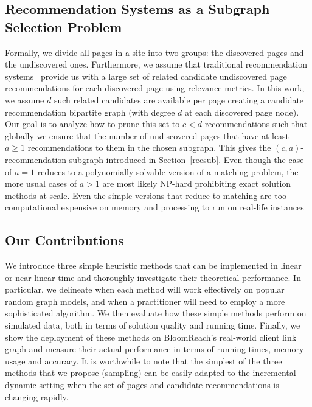 \subsection{Recommendation Systems as a Subgraph Selection Problem}

Formally, we divide all pages in a site into two groups: the discovered pages and the undiscovered ones.
Furthermore, we assume that traditional recommendation systems~\cite{Schafer1999, Adomavicius2005,
  Resnick1997} provide us with a large set of related candidate undiscovered page recommendations
for each discovered page using relevance metrics. In this work, we assume $d$
such related candidates are available per page creating a candidate recommendation bipartite graph
(with degree $d$ at each discovered page node).
Our goal is to analyze how to prune this set to $c < d$ recommendations such that
globally we ensure that the number of undiscovered pages that have at least $a \geq 1$ recommendations to them in the chosen subgraph. This gives the $(c,a)$-recommendation subgraph introduced in Section~\ref{recsub}. Even though the case of $a=1$ reduces to a polynomially solvable version of a matching problem, the more usual cases of $a > 1$ are most likely NP-hard prohibiting exact solution methods at scale. Even the simple versions that reduce to matching are too computational expensive on memory and processing to run on real-life instances \vs

\subsection{Our Contributions}

We introduce three simple heuristic methods that can be implemented in linear or near-linear time and thoroughly investigate their theoretical performance.
In particular, we delineate when each method will work effectively on popular random graph models, and when a practitioner will need to employ a more sophisticated algorithm. We then evaluate how these simple methods perform on simulated data, both in terms of solution quality and  running time.
Finally, we show the deployment of these methods on BloomReach's real-world client link graph and measure their actual performance in terms of running-times, memory usage and accuracy. It is worthwhile to note that the simplest of the three methods that we propose (sampling) can be easily adapted to the incremental dynamic setting when the set of pages and candidate recommendations is changing rapidly.
\vs

